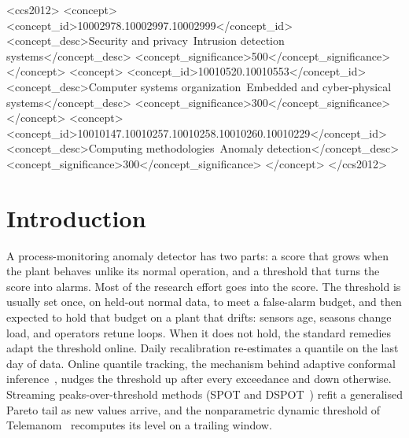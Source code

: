 \documentclass[sigconf,review,anonymous]{acmart}
\begin{document}
\begin{CCSXML}
<ccs2012>
 <concept>
  <concept_id>10002978.10002997.10002999</concept_id>
  <concept_desc>Security and privacy~Intrusion detection systems</concept_desc>
  <concept_significance>500</concept_significance>
 </concept>
 <concept>
  <concept_id>10010520.10010553</concept_id>
  <concept_desc>Computer systems organization~Embedded and cyber-physical systems</concept_desc>
  <concept_significance>300</concept_significance>
 </concept>
 <concept>
  <concept_id>10010147.10010257.10010258.10010260.10010229</concept_id>
  <concept_desc>Computing methodologies~Anomaly detection</concept_desc>
  <concept_significance>300</concept_significance>
 </concept>
</ccs2012>
\end{CCSXML}



\maketitle

\section{Introduction}

A process-monitoring anomaly detector has two parts: a score that grows when the plant behaves
unlike its normal operation, and a threshold that turns the score into alarms. Most of the
research effort goes into the score. The threshold is usually set once, on held-out normal data,
to meet a false-alarm budget, and then expected to hold that budget on a plant that drifts:
sensors age, seasons change load, and operators retune loops. When it does not hold, the standard
remedies adapt the threshold online. Daily recalibration re-estimates a quantile on the last day
of data. Online quantile tracking, the mechanism behind adaptive conformal
inference~\cite{gibbs2021aci}, nudges the threshold up after every exceedance and down otherwise.
Streaming peaks-over-threshold methods (SPOT and DSPOT~\cite{siffer2017spot}) refit a generalised
Pareto tail as new values arrive, and the nonparametric dynamic threshold of
Telemanom~\cite{hundman2018telemanom} recomputes its level on a trailing window.
\end{document}
